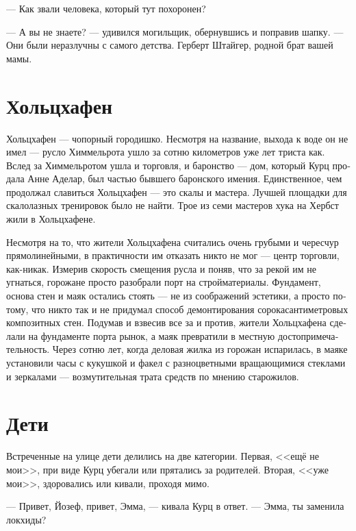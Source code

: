 \documentclass[a4paper,12pt,fleqn]{book}\usepackage{polyglossia}\setdefaultlanguage[babelshorthands=true]{russian}\setotherlanguage{english}\defaultfontfeatures{Ligatures=TeX,Mapping=tex-text}\usepackage{xcolor}\newcommand{\ml}[3]{#2}
\begin{document}
--- Как звали человека, который тут похоронен?

--- А вы не знаете? --- удивился могильщик, обернувшись и поправив шапку.
--- Они были неразлучны с самого детства.
Герберт Штайгер, родной брат вашей мамы.

\section{Хольцхафен}

Хольцхафен --- чопорный городишко.
Несмотря на название, выхода к воде он не имел --- русло Химмельрота ушло за сотню километров уже лет триста как.
Вслед за Химмельротом ушла и торговля, и баронство --- дом, который Курц продала Анне Аделар, был частью бывшего баронского имения.
Единственное, чем продолжал славиться Хольцхафен --- это скалы и мастера.
Лучшей площадки для скалолазных тренировок было не найти.
Трое из семи мастеров хука на Хербст жили в Хольцхафене.

Несмотря на то, что жители Хольцхафена считались очень грубыми и чересчур прямолинейными, в практичности им отказать никто не мог --- центр торговли, как-никак.
Измерив скорость смещения русла и поняв, что за рекой им не угнаться, горожане просто разобрали порт на стройматериалы.
Фундамент, основа стен и маяк остались стоять --- не из соображений эстетики, а просто потому, что никто так и не придумал способ демонтирования сорокасантиметровых композитных стен.
Подумав и взвесив все за и против, жители Хольцхафена сделали на фундаменте порта рынок, а маяк превратили в местную достопримечательность.
Через сотню лет, когда деловая жилка из горожан испарилась, в маяке установили часы с кукушкой и факел с разноцветными вращающимися стеклами и зеркалами --- возмутительная трата средств по мнению старожилов.

\section{Дети}

\ml{$0$}
{Встреченные на улице дети делились на две категории.}
{Children in the streets fell under two categories.}
\ml{$0$}
{Первая, <<ещё не мои>>, при виде Курц убегали или прятались за родителей.}
{The first one (``not mine yet'') ran away or hid behind their parents at the sight of Kurz.}
\ml{$0$}
{Вторая, <<уже мои>>, здоровались или кивали, проходя мимо.}
{The second one (``already mine'') said hello or nodded passing by.}

--- Привет, Йозеф, привет, Эмма, --- кивала Курц в ответ.
--- Эмма, ты заменила локхиды?
\end{document}
